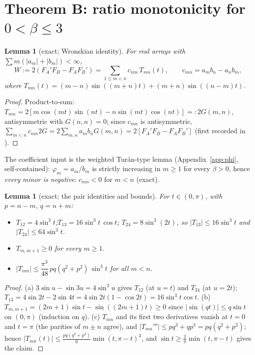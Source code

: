 \documentclass[11pt]{article}
\newtheorem{lemma}[theorem]{Lemma}
\theoremstyle{remark}
\newcommand{\FA}{F_{\!A}}
\newcommand{\FB}{F_{\!B}}
\begin{document}
\section{Theorem B: ratio monotonicity for $0<\beta\le3$}\label{sec:thmB}

\begin{lemma}[exact; Wronskian identity]\label{lem:wronskian}
For real arrays with $\sum m(|a_m|+|b_m|)<\infty$,
\begin{equation}\label{eq:wronskian}
W:=2(\FA'\FB-\FA\FB')=\sum_{1\le m<n}c_{mn}\,T_{mn}(t),\qquad
c_{mn}=a_mb_n-a_nb_m,
\end{equation}
where $T_{mn}(t)=(m-n)\sin((m+n)t)+(m+n)\sin((n-m)t)$.
\end{lemma}

\begin{proof}
Product-to-sum: $T_{mn}=2[m\cos(mt)\sin(nt)-n\sin(mt)\cos(nt)]=:2G(m,n)$,
antisymmetric with $G(n,n)=0$; since $c_{mn}$ is antisymmetric,
$\sum_{m<n}c_{mn}2G=2\sum_{m,n}a_mb_nG(m,n)=2[\FA'\FB-\FA\FB']$
\textup{(}first recorded in \cite{WronskianNote}\textup{)}.
\end{proof}

The coefficient input is the weighted Tur\'an-type lemma
(Appendix~\ref{app:phi}, self-contained): $\varphi_m=a_m/b_m$ is strictly
increasing in $m\ge1$ for every $\beta>0$, hence \emph{every minor is
negative}: $c_{mn}<0$ for $m<n$ (exact).

\begin{lemma}[exact; the pair identities and bounds]\label{lem:pairs}
For $t\in(0,\pi)$, with $p=n-m$, $q=n+m$:
\begin{itemize}
\item[(a)] $T_{12}=4\sin^3t$;\quad $T_{13}=16\sin^3t\,\cos t$;\quad
$T_{24}=8\sin^3(2t)$, so $|T_{13}|\le16\sin^3t$ and
$|T_{24}|\le64\sin^3t$.
\item[(b)] $T_{m,m+1}\ge0$ for every $m\ge1$.
\item[(c)] $|T_{mn}|\le\dfrac{\pi^3}{48}\,pq(q^2+p^2)\,\sin^3t$ for all
$m<n$.
\end{itemize}
\end{lemma}

\begin{proof}
(a) $3\sin u-\sin3u=4\sin^3u$ gives $T_{12}$ (at $u=t$) and $T_{24}$ (at
$u=2t$); $T_{13}=4\sin2t-2\sin4t=4\sin2t(1-\cos2t)=16\sin^3t\cos t$.
(b) $T_{m,m+1}=(2m+1)\sin t-\sin((2m+1)t)\ge0$ since
$|\sin(qt)|\le q\sin t$ on $(0,\pi)$ (induction on $q$).
(c) $T_{mn}$ and its first two derivatives vanish at $t=0$ and $t=\pi$
(the parities of $m\pm n$ agree), and $|T_{mn}'''|\le
pq^3+qp^3=pq(q^2+p^2)$; hence
$|T_{mn}(t)|\le\frac{pq(q^2+p^2)}{6}\min(t,\pi-t)^3$, and
$\sin t\ge\frac2\pi\min(t,\pi-t)$ gives the claim.
\end{proof}
\end{document}
